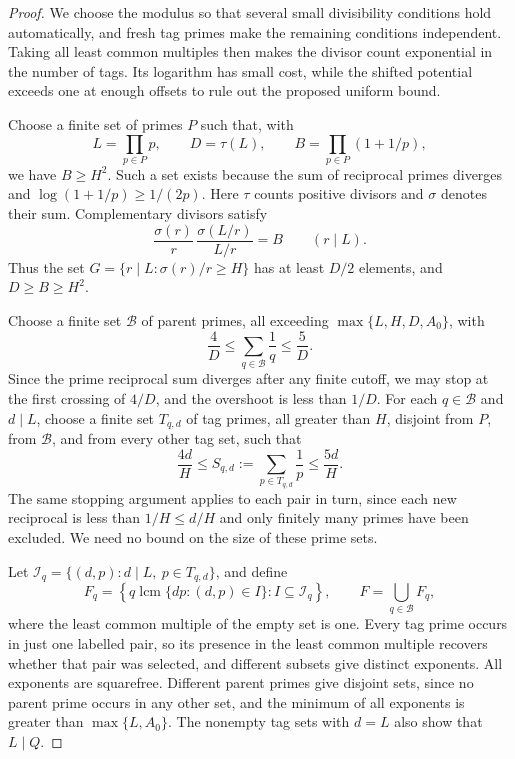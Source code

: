 \documentclass[11pt]{article}
\theoremstyle{plain}
\theoremstyle{definition}
\theoremstyle{remark}
\begin{document}
\begin{proof}
We choose the modulus so that several small divisibility conditions hold
automatically, and fresh tag primes make the remaining conditions independent.
Taking all least common multiples then makes the divisor count
exponential in the number of tags. Its logarithm has small cost, while the
shifted potential exceeds one at enough offsets to rule out
the proposed uniform bound.

Choose a finite set of primes $P$ such that, with
\[
 L=\prod_{p\in P}p,\qquad D=\tau(L),\qquad
 B=\prod_{p\in P}(1+1/p),
\]
we have $B\ge H^2$.  Such a set exists because the sum of reciprocal primes
diverges and $\log(1+1/p)\ge1/(2p)$.
Here $\tau$ counts positive divisors and $\sigma$ denotes their sum.
Complementary divisors satisfy
\[
 \frac{\sigma(r)}r\,
 \frac{\sigma(L/r)}{L/r}=B\qquad(r\mid L).
\]
Thus the set
$G=\{r\mid L:\sigma(r)/r\ge H\}$ has at least $D/2$ elements,
and $D\ge B\ge H^2$.

Choose a finite set $\mathcal B$ of parent primes, all exceeding
$\max\{L,H,D,A_0\}$, with
\[
 \frac4D\le\sum_{q\in\mathcal B}\frac1q\le\frac5D.
\]
Since the prime reciprocal sum diverges after any finite cutoff, we may
stop at the first crossing of $4/D$, and the overshoot is less than $1/D$.
For each $q\in\mathcal B$ and $d\mid L$, choose a finite set $T_{q,d}$
of tag primes, all greater than $H$, disjoint from $P$, from $\mathcal B$,
and from every other tag set, such that
\[
 \frac{4d}{H}\le S_{q,d}:=\sum_{p\in T_{q,d}}\frac1p\le\frac{5d}{H}.
\]
The same stopping argument applies to each pair in turn, since each new reciprocal is
less than $1/H\le d/H$ and only finitely many primes have been excluded.
We need no bound on the size of these prime sets.

Let $\mathcal I_q=\{(d,p):d\mid L,\ p\in T_{q,d}\}$, and define
\[
 F_q=\left\{q\operatorname{lcm}\{dp:(d,p)\in I\}:
                         I\subseteq\mathcal I_q\right\},
 \qquad F=\bigcup_{q\in\mathcal B}F_q,
\]
where the least common multiple of the empty set is one.
Every tag prime occurs in just one labelled pair, so its presence in the
least common multiple recovers whether that pair was selected, and
different subsets give distinct exponents.  All exponents are
squarefree.  Different parent primes give disjoint sets, since no parent
prime occurs in any other set, and the minimum of all exponents is greater than
$\max\{L,A_0\}$.  The nonempty tag sets with $d=L$ also show that $L\mid Q$.


\end{proof}
\end{document}

